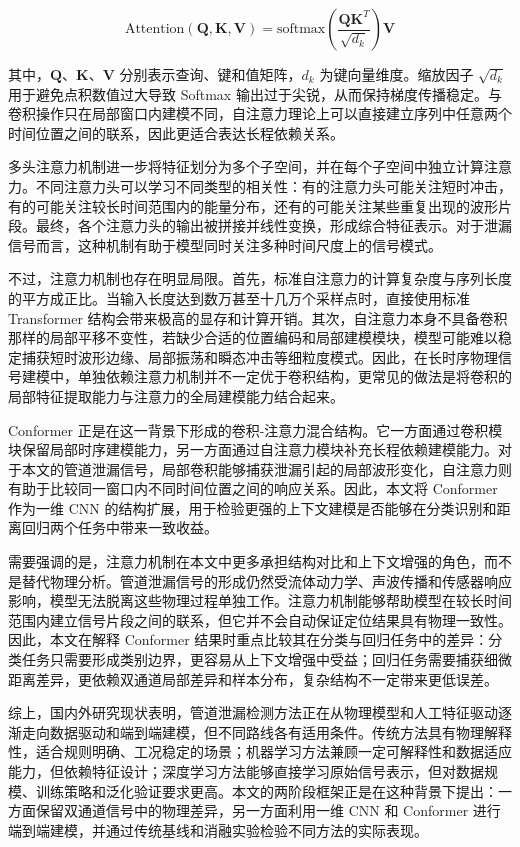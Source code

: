 \begin{equation}
\text{Attention}(\mathbf{Q},\mathbf{K},\mathbf{V}) =
\text{softmax}\left(\frac{\mathbf{Q}\mathbf{K}^{T}}{\sqrt{d_k}}\right)\mathbf{V}
\end{equation}

其中，$\mathbf{Q}$、$\mathbf{K}$、$\mathbf{V}$ 分别表示查询、键和值矩阵，$d_k$ 为键向量维度。缩放因子 $\sqrt{d_k}$ 用于避免点积数值过大导致 Softmax 输出过于尖锐，从而保持梯度传播稳定。与卷积操作只在局部窗口内建模不同，自注意力理论上可以直接建立序列中任意两个时间位置之间的联系，因此更适合表达长程依赖关系。

多头注意力机制进一步将特征划分为多个子空间，并在每个子空间中独立计算注意力。不同注意力头可以学习不同类型的相关性：有的注意力头可能关注短时冲击，有的可能关注较长时间范围内的能量分布，还有的可能关注某些重复出现的波形片段。最终，各个注意力头的输出被拼接并线性变换，形成综合特征表示。对于泄漏信号而言，这种机制有助于模型同时关注多种时间尺度上的信号模式。

不过，注意力机制也存在明显局限。首先，标准自注意力的计算复杂度与序列长度的平方成正比。当输入长度达到数万甚至十几万个采样点时，直接使用标准 Transformer 结构会带来极高的显存和计算开销。其次，自注意力本身不具备卷积那样的局部平移不变性，若缺少合适的位置编码和局部建模模块，模型可能难以稳定捕获短时波形边缘、局部振荡和瞬态冲击等细粒度模式。因此，在长时序物理信号建模中，单独依赖注意力机制并不一定优于卷积结构，更常见的做法是将卷积的局部特征提取能力与注意力的全局建模能力结合起来。

Conformer 正是在这一背景下形成的卷积-注意力混合结构。它一方面通过卷积模块保留局部时序建模能力，另一方面通过自注意力模块补充长程依赖建模能力。对于本文的管道泄漏信号，局部卷积能够捕获泄漏引起的局部波形变化，自注意力则有助于比较同一窗口内不同时间位置之间的响应关系。因此，本文将 Conformer 作为一维 CNN 的结构扩展，用于检验更强的上下文建模是否能够在分类识别和距离回归两个任务中带来一致收益。

需要强调的是，注意力机制在本文中更多承担结构对比和上下文增强的角色，而不是替代物理分析。管道泄漏信号的形成仍然受流体动力学、声波传播和传感器响应影响，模型无法脱离这些物理过程单独工作。注意力机制能够帮助模型在较长时间范围内建立信号片段之间的联系，但它并不会自动保证定位结果具有物理一致性。因此，本文在解释 Conformer 结果时重点比较其在分类与回归任务中的差异：分类任务只需要形成类别边界，更容易从上下文增强中受益；回归任务需要捕获细微距离差异，更依赖双通道局部差异和样本分布，复杂结构不一定带来更低误差。

综上，国内外研究现状表明，管道泄漏检测方法正在从物理模型和人工特征驱动逐渐走向数据驱动和端到端建模，但不同路线各有适用条件。传统方法具有物理解释性，适合规则明确、工况稳定的场景；机器学习方法兼顾一定可解释性和数据适应能力，但依赖特征设计；深度学习方法能够直接学习原始信号表示，但对数据规模、训练策略和泛化验证要求更高。本文的两阶段框架正是在这种背景下提出：一方面保留双通道信号中的物理差异，另一方面利用一维 CNN 和 Conformer 进行端到端建模，并通过传统基线和消融实验检验不同方法的实际表现。


